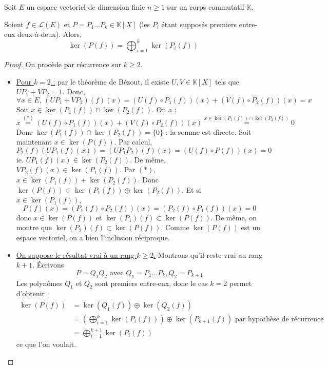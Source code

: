 






	Soit $E$ un espace vectoriel de dimension finie $n \geq 1$ sur un corps commutatif $\mathbb{K}$.

	\begin{lemma}
		\label{lemme-des-noyaux-1}
		Soient $f \in \mathcal{L}(E)$ et $P = P_1 \dots P_k \in \mathbb{K}[X]$ (les $P_i$ étant supposés premiers entre-eux deux-à-deux). Alors,
		\[ \ker(P(f)) = \bigoplus_{i = 1}^k \ker(P_i(f)) \]
	\end{lemma}

	\begin{proof}
		On procède par récurrence sur $k \geq 2$.
		\begin{itemize}
			\item \uline{Pour $k = 2$ :} par le théorème de Bézout, il existe $U, V \in \mathbb{K}[X]$ tels que $UP_1 + VP_2 = 1$. Donc,
			\[ \forall x \in E, \, (UP_1 + VP_2)(f)(x) = (U(f) \circ P_1(f))(x) + (V(f) \circ P_2(f))(x) = x \tag{$*$} \]
			Soit $x \in \ker(P_1(f)) \cap \ker(P_2(f))$. On a :
			\[ x \overset{(*)}{=} (U(f) \circ P_1(f))(x) + (V(f) \circ P_2(f))(x) \overset{x \in \ker(P_1(f)) \cap \ker(P_2(f))}{=} 0 \]
			Donc $\ker(P_1(f)) \cap \ker(P_2(f)) = \{ 0 \}$ : la somme est directe.
			\newpar
			Soit maintenant $x \in \ker(P(f))$. Par calcul,
			\[ P_2(f)(UP_1(f)(x)) = (UP_1P_2)(f)(x) = (U(f) \circ P(f))(x) = 0 \]
			ie. $UP_1(f)(x) \in \ker(P_2(f))$. De même, $VP_2(f)(x) \in \ker(P_1(f))$. Par $(*)$, $x \in \ker(P_1(f)) + \ker(P_2(f))$. Donc $\ker(P(f)) \subset \ker(P_1(f)) \oplus \ker(P_2(f))$.
			\newpar
			Et si $x \in \ker(P_1(f))$,
			\[ P(f)(x) = (P_1(f) \circ P_2(f))(x) = (P_2(f) \circ P_1(f))(x) = 0 \]
			donc $x \in \ker(P(f))$ et $\ker(P_1)(f) \subset \ker(P(f))$. De même, on montre que $\ker(P_2)(f) \subset \ker(P(f))$. Comme $\ker(P(f))$ est un espace vectoriel, on a bien l'inclusion réciproque.
			\item \uline{On suppose le résultat vrai à un rang $k \geq 2$.} Montrons qu'il reste vrai au rang $k+1$. Écrivons
			\[ P = Q_1Q_2 \text{ avec } Q_1 = P_1 \dots P_k, Q_2 = P_{k+1} \]
			Les polynômes $Q_1$ et $Q_2$ sont premiers entre-eux, donc le cas $k = 2$ permet d'obtenir :
			\begin{align*}
				\ker(P(f)) &= \ker(Q_1(f)) \oplus \ker(Q_2(f)) \\
				&= \left( \bigoplus_{i = 1}^k \ker(P_i(f)) \right) \oplus \ker(P_{k+1}(f)) \text{ par hypothèse de récurrence} \\
				&= \bigoplus_{i = 1}^{k+1} \ker(P_i(f))
			\end{align*}
			ce que l'on voulait.
		\end{itemize}
	\end{proof}

